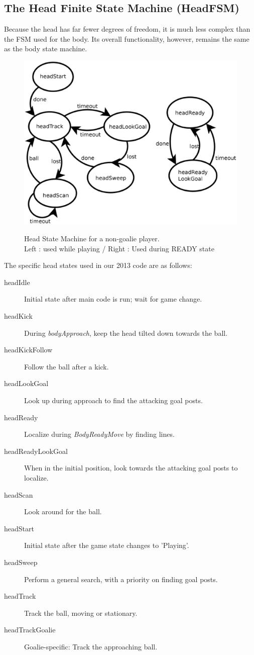 \documentclass{article}
\begin{document}
	\subsection{The Head Finite State Machine (HeadFSM)}
		Because the head has far fewer degrees of freedom, it is much less complex than the FSM used for the body. Its overall functionality, however, remains the same as the body state machine.
		\begin{figure}[H]
			\centering
			\includegraphics[width=.8\textwidth]{figures/HeadFSM.eps}
			\label{fig:headfsm}
			\caption{Head State Machine for a non-goalie player. \\Left : used while playing / Right	: Used during READY state}
			\label{fig:headfsm}
		\end{figure}

		The specific head states used in our 2013 code are as follows:
		\begin{multicols}{2}
			\begin{description}
				\item[headIdle] Initial state after main code is run; wait for game change.
				\item[headKick] During \textit{bodyApproach}, keep the head tilted down towards the ball.
				\item[headKickFollow] Follow the ball after a kick.
				\item[headLookGoal] Look up during approach to find the attacking goal posts.
				\item[headReady] Localize during \textit{BodyReadyMove} by finding lines.
				\item[headReadyLookGoal] When in the initial position, look towards the attacking goal posts to localize.
				\item[headScan] Look around for the ball.
				\item[headStart] Initial state after the game state changes to 'Playing'.
				\item[headSweep] Perform a general search, with a priority on finding goal posts.
				\item[headTrack] Track the ball, moving or stationary.
				\item[headTrackGoalie] Goalie-specific: Track the approaching ball.
			\end{description}
		\end{multicols}
\end{document}
